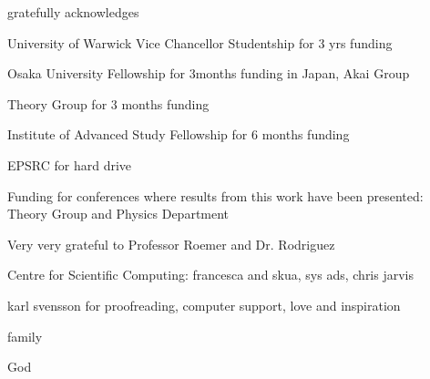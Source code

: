 gratefully acknowledges

University of Warwick Vice Chancellor Studentship for 3 yrs funding

Osaka University Fellowship for 3months funding in Japan, Akai Group

Theory Group for 3 months funding

Institute of Advanced Study Fellowship for 6 months funding

EPSRC for hard drive


Funding for conferences where results from this work have been presented:
Theory Group and Physics Department


Very very grateful to
Professor Roemer and Dr. Rodriguez


Centre for Scientific Computing: francesca and skua, sys ads, chris jarvis


karl svensson for proofreading, computer support, love and inspiration

family

God
